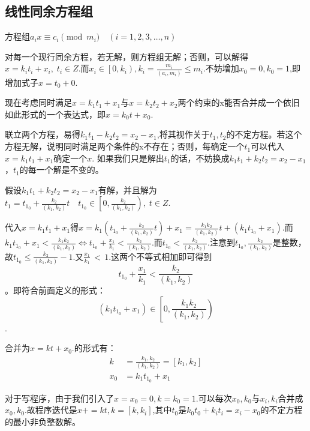 	\subsection{线性同余方程组}
		\par 方程组$a_ix \equiv c_i \pmod{m_i} \quad (i=1, 2, 3, \ldots, n)$
		\par 对每一个现行同余方程，若无解，则方程组无解；否则，可以解得$x=k_it_i+x_i, \; t_i \in Z$.而$x_i \in \left[0,k_i\right), k_i = \frac{m_i}{(a_i,m_i)} \leq m_i$.不妨增加$x_0=0,k_0=1$,即增加式子$x=t_0+0$.
		\par 现在考虑同时满足$x=k_1t_1+x_1$与$x=k_2t_2+x_2$两个约束的x能否合并成一个依旧如此形式的一个表达式，即$x=k_0t+x_0$.
		\par 联立两个方程，易得$k_1t_1-k_2t_2=x_2-x_1$,将其视作关于$t_1,t_2$的不定方程。若这个方程无解，说明同时满足两个条件的x不存在；否则，每确定一个$t_1$可以代入$x=k_1t_1+x_1$确定一个$x$. 如果我们只是解出$t_1$的话，不妨换成$k_1t_1+k_2t_2=x_2-x_1$，$t_1$的每一个解是不变的。
		\par 假设$k_1t_1+k_2t_2=x_2-x_1$有解，并且解为$t_1=t_{1_0}+\frac{k_2}{(k_1,k_2)}t \quad t_{1_0} \in \left[ 0,\frac{k_2}{(k_1,k_2)} \right), \; t \in Z$.
		\par 代入$x=k_1t_1+x_1$得$x=k_1(t_{1_0}+\frac{k_2}{(k_1,k_2)}t)+x_1=\frac{k_1k_2}{(k_1,k_2)}t+(k_1t_{1_0}+x_1)$.而$k_1t_{1_0}+x_1 < \frac{k_1k_2}{(k_1,k_2)} \Longleftrightarrow t_{1_0}+\frac{x_1}{k_1} < \frac{k_2}{(k_1,k_2)}$.而$t_{1_0} < \frac{k_2}{(k_1,k_2)}$.注意到$t_{1_0},\frac{k_2}{(k_1,k_2)}$是整数，故$t_{1_0} \leq \frac{k_2}{(k_1,k_2)}-1$.又$\frac{x_1}{k_1}\, <\, 1$.这两个不等式相加即可得到$$t_{1_0}+\frac{x_1}{k_1} < \frac{k_2}{(k_1,k_2)}$$。即符合前面定义的形式：$$(k_1t_{1_0}+x_1) \in \left[0, \frac{k_1k_2}{(k_1,k_2)}\right)$$.
		\par 合并为$x=kt+x_0.$的形式有：\begin{align*}
			k &=\frac{k_1,k_2}{(k_1,k_2)}=[k_1,k_2] \\
			x_0 &=k_1t_{1_0}+x_1
		\end{align*}
		\par 对于写程序，由于我们引入了$x=x_0=0,k=k_0=1$.可以每次$x_0,k_0$与$x_i,k_i$合并成$x_0,k_0$.故程序迭代是$x+=kt,k=[k,k_i]$,其中$t_0$是$k_0t_0+k_it_i=x_i-x_0$的不定方程的最小非负整数解。
